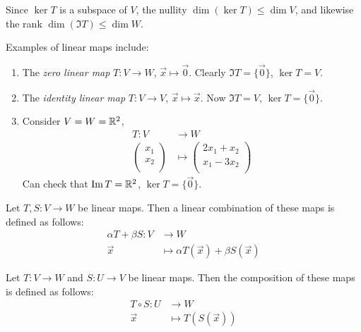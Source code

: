 \documentclass{../template/note}
\begin{document}
    \begin{remark}
        Since \(\ker T\) is a subspace of \(V\), the nullity \(\dim(\ker T) \leq \dim V\), and likewise the rank \(\dim(\Im T) \leq \dim W\).
    \end{remark}
    
    \begin{example}
        Examples of linear maps include:
        \begin{enumerate}[label=\protect\circled{\arabic*}]
            \item The \emph{zero linear map} \(T: V \to W\), \(\vec x \mapsto \vec 0\). Clearly \(\Im T = \{\vec 0\}\), \(\ker T = V\).
            \item The \emph{identity linear map} \(T: V \to V\), \(\vec x \mapsto \vec x\). Now \(\Im T = V\), \(\ker T = \{\vec 0\}\).
            \item Consider \(V = W = \mathbb R^2\),
            \begin{align*}
                T: V &\to W \\
                \begin{pmatrix}
                 x_1 \\
                 x_2 \\
                \end{pmatrix} &\mapsto
                \begin{pmatrix}
                 2x_1 + x_2 \\
                 x_1 - 3x_2 \\
                \end{pmatrix}
            \end{align*}
            Can check that \(\operatorname{Im} T = \mathbb R^2\), \(\ker T = \{\vec 0\}\).            
        \end{enumerate}
    \end{example}

    \begin{definition}
        Let \(T, S: V \to W\) be linear maps. Then a linear combination of these maps is defined as follows:
        \begin{align*}
            \alpha T + \beta S: V &\to W \\
            \vec x &\mapsto \alpha T(\vec x) + \beta S(\vec x)
        \end{align*}
    \end{definition}
    
    \begin{definition}
        Let \(T: V \to W\) and \(S: U \to V\) be linear maps. Then the composition of these maps is defined as follows:
        \begin{align*}
            T \circ S: U &\to W \\
            \vec x &\mapsto T(S(\vec x))
        \end{align*}
    \end{definition}
    
\end{document}
